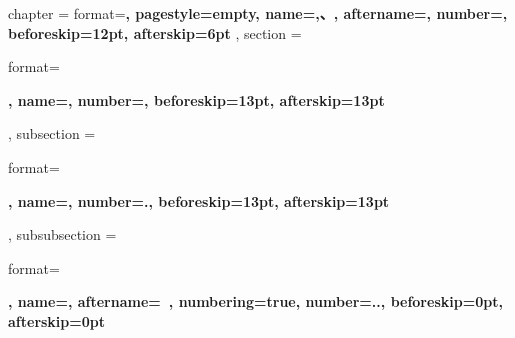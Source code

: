 \ctexset
{
    chapter =
    {
        format=\centering{}\bfseries,
        pagestyle=empty,
        name={,、},
        aftername=,
        number=,
        beforeskip=12pt,
        afterskip=6pt
    },
    section =
    {
        format=\raggedright{}\bfseries,
        name={},
        number=,
        beforeskip=13pt,
        afterskip=13pt
    },
    subsection =
    {
        format=\raggedright{}\bfseries,
        name={},
        number=.,
        beforeskip=13pt,
        afterskip=13pt
    },
    subsubsection =
    {
        format=\raggedright{}\bfseries,
        name={},
        aftername=~,
        numbering=true,
        number=..,
        beforeskip=0pt,
        afterskip=0pt
    }
}
